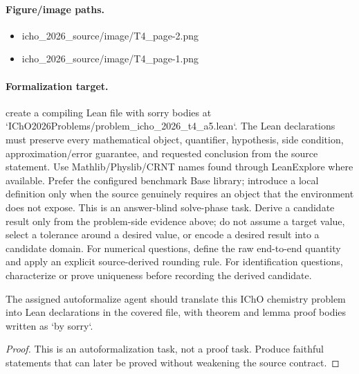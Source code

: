 \paragraph{Figure/image paths.}
\begin{itemize}
\item icho\_2026\_source/image/T4\_page-2.png
\item icho\_2026\_source/image/T4\_page-1.png
\end{itemize}

\paragraph{Formalization target.}
create a compiling Lean file with sorry bodies at `IChO2026Problems/problem\_icho\_2026\_t4\_a5.lean`.
The Lean declarations must preserve every mathematical object, quantifier, hypothesis, side condition, approximation/error guarantee, and requested conclusion from the source statement.
Use Mathlib/Physlib/CRNT names found through LeanExplore where available. Prefer the configured benchmark Base library; introduce a local definition only when the source genuinely requires an object that the environment does not expose.
This is an answer-blind solve-phase task. Derive a candidate result only from the problem-side evidence above; do not assume a target value, select a tolerance around a desired value, or encode a desired result into a candidate domain.
For numerical questions, define the raw end-to-end quantity and apply an explicit source-derived rounding rule. For identification questions, characterize or prove uniqueness before recording the derived candidate.

\begin{theorem}
\label{thm:physics:icho_2026_t4_a5:target}
The assigned autoformalize agent should translate this IChO chemistry problem into Lean declarations in the covered file, with theorem and lemma proof bodies written as `by sorry`.
\end{theorem}
\begin{proof}
This is an autoformalization task, not a proof task. Produce faithful statements that can later be proved without weakening the source contract.
\end{proof}
